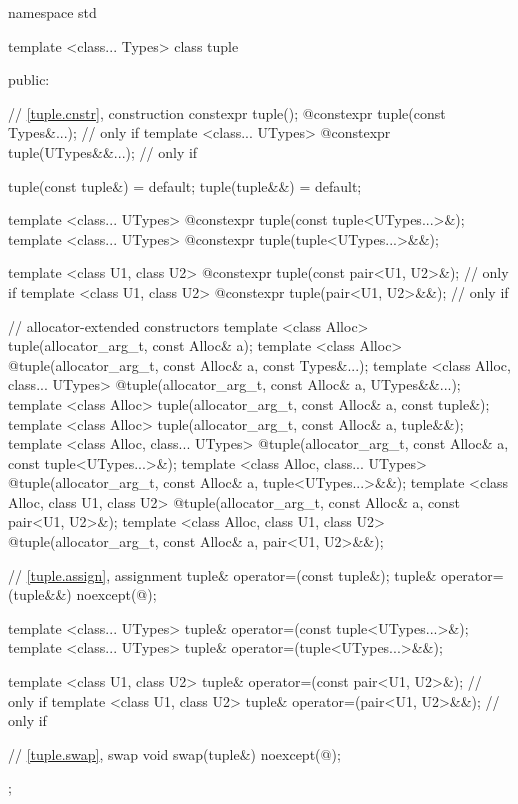 %
\begin{codeblock}
namespace std {
  template <class... Types>
  class tuple  {
  public:

    // \ref{tuple.cnstr},  construction
    constexpr tuple();
    @\EXPLICIT@ constexpr tuple(const Types&...); // only if 
    template <class... UTypes>
      @\EXPLICIT@ constexpr tuple(UTypes&&...); // only if 

    tuple(const tuple&) = default;
    tuple(tuple&&) = default;

    template <class... UTypes>
      @\EXPLICIT@ constexpr tuple(const tuple<UTypes...>&);
    template <class... UTypes>
      @\EXPLICIT@ constexpr tuple(tuple<UTypes...>&&);

    template <class U1, class U2>
      @\EXPLICIT@ constexpr tuple(const pair<U1, U2>&);       // only if 
    template <class U1, class U2>
      @\EXPLICIT@ constexpr tuple(pair<U1, U2>&&);            // only if 

    // allocator-extended constructors
    template <class Alloc>
      tuple(allocator_arg_t, const Alloc& a);
    template <class Alloc>
      @\EXPLICIT@ tuple(allocator_arg_t, const Alloc& a, const Types&...);
    template <class Alloc, class... UTypes>
      @\EXPLICIT@ tuple(allocator_arg_t, const Alloc& a, UTypes&&...);
    template <class Alloc>
      tuple(allocator_arg_t, const Alloc& a, const tuple&);
    template <class Alloc>
      tuple(allocator_arg_t, const Alloc& a, tuple&&);
    template <class Alloc, class... UTypes>
      @\EXPLICIT@ tuple(allocator_arg_t, const Alloc& a, const tuple<UTypes...>&);
    template <class Alloc, class... UTypes>
      @\EXPLICIT@ tuple(allocator_arg_t, const Alloc& a, tuple<UTypes...>&&);
    template <class Alloc, class U1, class U2>
      @\EXPLICIT@ tuple(allocator_arg_t, const Alloc& a, const pair<U1, U2>&);
    template <class Alloc, class U1, class U2>
      @\EXPLICIT@ tuple(allocator_arg_t, const Alloc& a, pair<U1, U2>&&);

    // \ref{tuple.assign},  assignment
    tuple& operator=(const tuple&);
    tuple& operator=(tuple&&) noexcept(@\seebelow@);

    template <class... UTypes>
      tuple& operator=(const tuple<UTypes...>&);
    template <class... UTypes>
      tuple& operator=(tuple<UTypes...>&&);

    template <class U1, class U2>
      tuple& operator=(const pair<U1, U2>&);    // only if 
    template <class U1, class U2>
      tuple& operator=(pair<U1, U2>&&);         // only if 

    // \ref{tuple.swap},  swap
    void swap(tuple&) noexcept(@\seebelow@);
  };
}
\end{codeblock}

